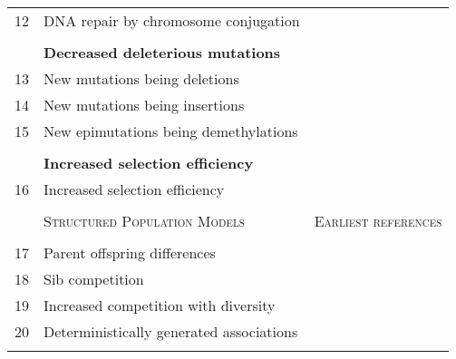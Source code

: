 \begin{table}
{\begin{tabular}{@{}llr@{}}
12          & DNA repair by chromosome conjugation                           & \cite{farley_gametes_1982}                  \\
            &                                                                & \textbf{}                    \\
            & \textbf{Decreased deleterious mutations}                       &                              \\
13          & New mutations being deletions                                  & \cite{bengtsson_biased_1986}               \\
14          & New mutations being insertions                                 & \cite{ettinger_meiosis-selection_1986}                \\
15          & New epimutations being demethylations                          & \cite{holliday_possible_1988}                \\
            &                                                                & \textbf{}                    \\
            & \textbf{Increased selection efficiency}                        &                              \\
16          & Increased selection efficiency                                 & \cite{geodakyan_role_1965}                    \\
            &                                                                &                              \\ \midrule
            & \textsc{Structured Population Models}                          & \textsc{Earliest references} \\
            &                                                                &                              \\
17          & Parent offspring differences                                   & \cite{rice_parent-offspring_1983,rice_sexual_1983}                 \\
18          & Sib competition                                                & \cite{williams_sex_1975}               \\
19          & Increased competition with diversity                           & \cite{maynard-smith_evolution_1978}           \\
20          & Deterministically generated associations                       & \cite{serebrovsky_nekotoryye_1973}            \\
            &                                                                &                              \\ \bottomrule
\end{tabular}
}
\end{table}

